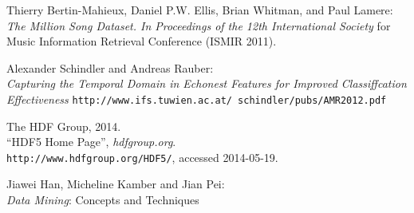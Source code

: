 \begin{thebibliography}{10}


Thierry Bertin-Mahieux, Daniel P.W. Ellis, Brian Whitman, and Paul Lamere:\\
\emph{The Million Song Dataset. In Proceedings of the 12th International Society}
for Music Information Retrieval Conference (ISMIR 2011).

Alexander Schindler and Andreas Rauber: \\
\emph{Capturing the Temporal Domain in Echonest Features for Improved Classiffcation Effectiveness}
\texttt{http://www.ifs.tuwien.ac.at/~schindler/pubs/AMR2012.pdf}

The HDF Group,
2014.\\
``HDF5 Home Page'',
\emph{hdfgroup.org}.\\
\verb+http://www.hdfgroup.org/HDF5/+, accessed 2014-05-19.

Jiawei Han, Micheline Kamber and Jian Pei:\\
\emph{Data Mining}: Concepts and Techniques

\end{thebibliography}